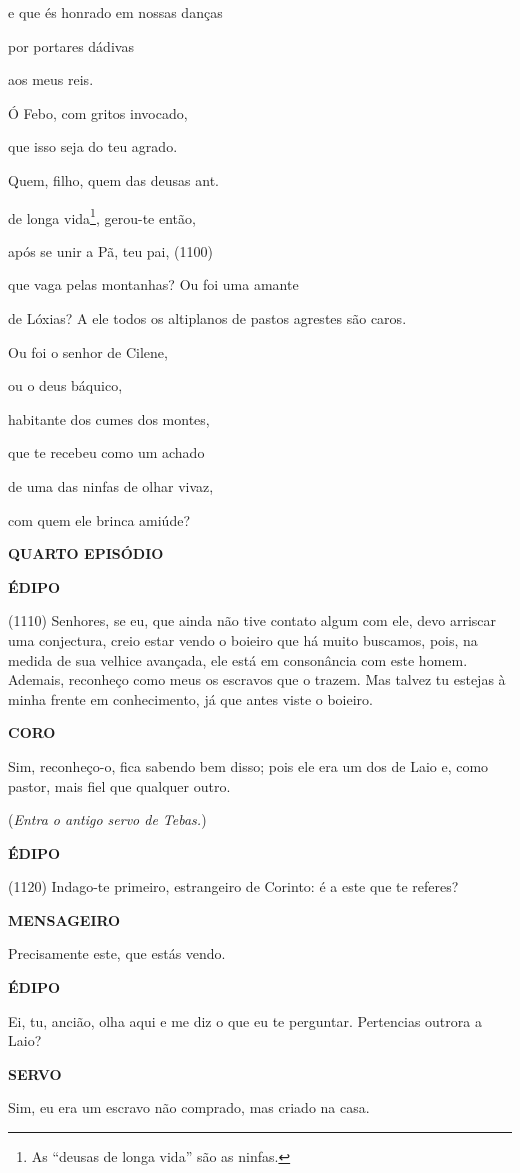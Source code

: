e que és honrado em nossas danças

por portares dádivas

aos meus reis.

Ó Febo, com gritos invocado,

que isso seja do teu agrado.

Quem, filho, quem das deusas ant.

de longa vida\footnote{As ``deusas de longa vida'' são as ninfas.},
gerou-te então,

após se unir a Pã, teu pai, (1100)

que vaga pelas montanhas? Ou foi uma amante

de Lóxias? A ele todos os altiplanos de pastos agrestes são caros.

Ou foi o senhor de Cilene,

ou o deus báquico,

habitante dos cumes dos montes,

que te recebeu como um achado

de uma das ninfas de olhar vivaz,

com quem ele brinca amiúde?

\textbf{QUARTO EPISÓDIO}

\textbf{ÉDIPO}

(1110) Senhores, se eu, que ainda não tive contato algum com ele, devo
arriscar uma conjectura, creio estar vendo o boieiro que há muito
buscamos, pois, na medida de sua velhice avançada, ele está em
consonância com este homem. Ademais, reconheço como meus os escravos que
o trazem. Mas talvez tu estejas à minha frente em conhecimento, já que
antes viste o boieiro.

\textbf{CORO}

Sim, reconheço-o, fica sabendo bem disso; pois ele era um dos de Laio e,
como pastor, mais fiel que qualquer outro.

(\emph{Entra o antigo servo de Tebas.})

\textbf{ÉDIPO}

(1120) Indago-te primeiro, estrangeiro de Corinto: é a este que te
referes?

\textbf{MENSAGEIRO}

Precisamente este, que estás vendo.

\textbf{ÉDIPO}

Ei, tu, ancião, olha aqui e me diz o que eu te perguntar. Pertencias
outrora a Laio?

\textbf{SERVO}

Sim, eu era um escravo não comprado, mas criado na casa.

